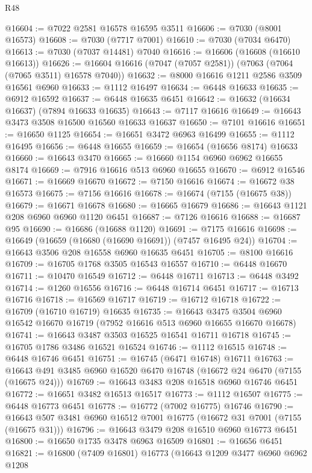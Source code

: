 \begin{lexlean}{R48}
\begin{coremodule}
@16604 := @7022 @2581 @16578 @16595 @3511
@16606 := @7030 (@8001 @16573)
@16608 := @7030 (@7717 @7001)
@16610 := @7030 (@7034 @6470)
@16613 := @7030 (@7037 @14481) @7040
@16616 := @16606 (@16608 (@16610 @16613))
@16626 := @16604 @16616 (@7047 (@7057 @2581)) (@7063 (@7064 (@7065 @3511) @16578 @7040))
@16632 := @8000 @16616 @1211 @2586 @3509 @16561 @6960
@16633 := @1112 @16497
@16634 := @6448 @16633
@16635 := @6912 @16592
@16637 := @6448 @16635 @6451
@16642 := @16632 (@16634 @16637) (@7894 @16633 @16635)
@16643 := @7117 @16616
@16649 := @16643 @3473 @3508 @16500 @16560 @16633 @16637
@16650 := @7101 @16616
@16651 := @16650 @1125
@16654 := @16651 @3472 @6963 @16499
@16655 := @1112 @16495
@16656 := @6448 @16655
@16659 := @16654 (@16656 @8174) @16633
@16660 := @16643 @3470
@16665 := @16660 @1154 @6960 @6962 @16655 @8174
@16669 := @7916 @16616 @513 @6960 @16655
@16670 := @6912 @16546
@16671 := @16669 @16670
@16672 := @7150 @16616
@16674 := @16672 @38 @16573
@16675 := @7156 @16616
@16678 := @16674 (@7155 (@16675 @38))
@16679 := @16671 @16678
@16680 := @16665 @16679
@16686 := @16643 @1121 @208 @6960 @6960 @1120 @6451
@16687 := @7126 @16616
@16688 := @16687 @95
@16690 := @16686 (@16688 @1120)
@16691 := @7175 @16616
@16698 := @16649 (@16659 (@16680 (@16690 @16691)) (@7457 @16495 @24))
@16704 := @16643 @3506 @208 @16558 @6960 @16635 @6451
@16705 := @8100 @16616
@16709 := @16705 @1768 @3505 @16543 @16557
@16710 := @6448 @16670
@16711 := @10470 @16549
@16712 := @6448 @16711
@16713 := @6448 @3492
@16714 := @1260 @16556
@16716 := @6448 @16714 @6451
@16717 := @16713 @16716
@16718 := @16569 @16717
@16719 := @16712 @16718
@16722 := @16709 (@16710 @16719) @16635
@16735 := @16643
    @3475
    @3504
    @6960
    @16542
    @16670
    @16719
    (@7952 @16616 @513 @6960 @16655 @16670 @16678)
@16741 := @16643 @3487 @3503 @16525 @16541 @16711 @16718
@16745 := @16705 @1786 @3486 @16521 @16524
@16746 := @1112 @16515
@16748 := @6448 @16746 @6451
@16751 := @16745 (@6471 @16748) @16711
@16763 := @16643 @491 @3485 @6960 @16520 @6470 @16748 (@16672 @24 @6470 (@7155 (@16675 @24)))
@16769 := @16643 @3483 @208 @16518 @6960 @16746 @6451
@16772 := @16651 @3482 @16513 @16517
@16773 := @1112 @16507
@16775 := @6448 @16773 @6451
@16778 := @16772 (@7002 @16775) @16746
@16790 := @16643 @507 @3481 @6960 @16512 @7001 @16775 (@16672 @31 @7001 (@7155 (@16675 @31)))
@16796 := @16643 @3479 @208 @16510 @6960 @16773 @6451
@16800 := @16650 @1735 @3478 @6963 @16509
@16801 := @16656 @6451
@16821 := @16800
    (@7409 @16801)
    @16773
    (@16643
      @1209
      @3477
      @6960
      @6962
      @1208

\end{coremodule}
\end{lexlean}
